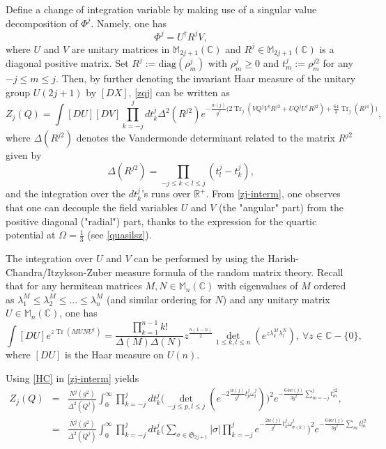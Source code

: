 \documentclass[a4paper,11pt,twoside]{article}
\numberwithin{equation}{section}
\DeclareMathOperator{\tr}{Tr}
\theoremstyle{nonumberplain}
\newcounter{and}
\begin{document}
Define a change of integration variable by making use of a singular value decomposition of $\Phi^j$. Namely, one has%
%
\begin{equation}
\Phi^j=U^\dag R^jV, 
\end{equation}
%
where $U$ and $V$ are unitary matrices in $\mathbb{M}_{2j+1}(\mathbb{C})$ and $R^j\in\mathbb{M}_{2j+1}(\mathbb{C})$ is a diagonal positive matrix. Set $R^j:=\text{diag}(\rho^j_{m})$ with $\rho^j_m\ge0$ and $t^j_m:=\rho^{j2}_m$ for any $-j\le m\le j$. Then, by further denoting the invariant Haar measure of the unitary group $U(2j+1)$ by $[DX]$, \eqref{zqj} can be written as%
%
\begin{equation}
Z_j(Q)=\int[DU][DV]\prod_{k=-j}^jdt^j_k\Delta^2(R^{j2})e^{-\frac{w(j)}{g^2}\big(2\tr_j(VQ^jV^\dag R^{j2}+UQ^jU^\dag R^{j2})+\frac{64}{3}\tr_j(R^{j4})  \big)}\label{zj-interm},
\end{equation}
%
where $\Delta(R^{j2})$ denotes the Vandermonde determinant related to the matrix $R^{j2}$ given by%
%
\begin{equation}
\Delta(R^{j2})=\prod_{-j\le k<l\le j}(t^{j}_l-t^{j}_k)\label{vanderrho2},
\end{equation}
%
and the integration over the $dt^j_k$'s runs over $\mathbb{R}^+$. From \eqref{zj-interm}, one observes that one can decouple the field variables $U$ and $V$ (the "angular" part) from the positive diagonal ("radial") part, thanks to the expression for the quartic potential at $\Omega=\frac{1}{3}$ (see \eqref{quasilsz}).\par%
The integration over $U$ and $V$ can be performed by using the Harish-Chandra/Itzykson-Zuber measure formula of the random matrix theory. Recall that for any hermitean matrices $M,N\in\mathbb{M}_n(\mathbb{C})$ with eigenvalues of $M$ ordered as $\lambda^M_1\le\lambda^M_2\le...\le\lambda^M_n$ (and similar ordering for $N$) and any unitary matrix $U\in\mathbb{M}_n(\mathbb{C})$, one has%
%
\begin{equation}
\int[DU]e^{z\tr(MUNU^\dag)}=\frac{\prod_{k=1}^{n-1}k!}{\Delta(M)\Delta(N)}z^{\frac{n(1-n)}{2}}\det_{1\le k,l\le n}(e^{z\lambda^M_k\lambda^N_l}),\ \forall z\in\mathbb{C}-\{0\}\label{HC},
\end{equation}
%
where $[DU]$ is the Haar measure on $U(n)$. \par%
%
Using \eqref{HC} in \eqref{zj-interm} yields%
%
\begin{eqnarray}
Z_j(Q)&=&\frac{N^j(g^2)}{\Delta^2(Q^j)}\int_0^\infty\prod_{k=-j}^jdt^j_k\big(\det_{-j\le p,l\le j}(e^{-2\frac{w(j)}{g^2}t^j_p\omega^j_{l}})\big)^2e^{-\frac{64w(j)}{3g^2}\sum_{m=-j}^jt^{j2}_m}\label{zj-partial},\\
&=&\frac{N^j(g^2)}{\Delta^2(Q^j)}\int_0^\infty\prod_{k=-j}^jdt^j_k\big(\sum_{\sigma\in\mathfrak{S}_{2j+1}}\vert\sigma\vert\prod_{k=-j}^je^{-\frac{2w(j)}{g^2}t^j_k\omega^j_{\sigma(k)}} \big)^2e^{-\frac{64w(j)}{3g^2}\sum_{m}t^{j2}_m}\label{zj-partialbis}
\end{eqnarray}
\end{document}
